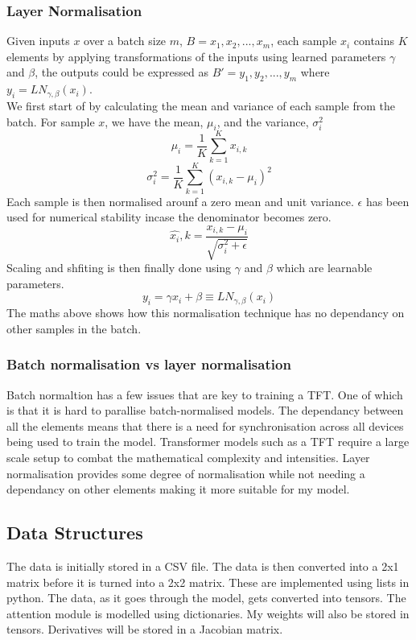 \documentclass{article}
\begin{document}
\subsubsection{Layer Normalisation}


Given inputs $x$ over a batch size $m$, $B = {x_1,x_2, ..., x_m}$, each sample $x_i$ contains $K$ elements by applying transformations of the inputs using learned parameters
$\gamma$ and $\beta$, the outputs could be expressed as $B' = {y_1,y_2,...,y_m}$ where
$y_i=LN_{\gamma,\beta}(x_i)$. \\
We first start of by calculating the mean and variance of each sample from the batch.
For sample $x$, we have the mean, $\mu_i$, and the variance, $\sigma_i^2$
$$\mu_i = \frac{1}{K}\sum^K_{k=1}x_{i,k}$$
$$\sigma_i^2 = \frac{1}{K}\sum^K_{k=1}(x_{i,k}-\mu_i)^2$$
Each sample is then normalised arounf a zero mean and unit variance. $\epsilon$ has been used for numerical stability incase the denominator becomes zero.
$$\hat{x_i},k= \frac{x_{i,k}-\mu_i}{\sqrt{\sigma_i^2+\epsilon}}$$
Scaling and shfiting is then finally done using $\gamma$ and $\beta$ which are learnable parameters.
$$y_i = \gamma \hat{x_i}+\beta \equiv LN_{\gamma,\beta}(x_i)$$
The maths above shows how this normalisation technique has no dependancy on other samples in the batch.
\subsubsection{Batch normalisation vs layer normalisation}
Batch normaltion has a few issues that are key to training a TFT. One of which is that
it is hard to parallise batch-normalised models. The dependancy between all the elements
 means that there is a need for synchronisation across all devices being used to train the model. Transformer models such as a TFT require a large scale setup to combat the
 mathematical complexity and intensities. Layer normalisation provides some degree of
 normalisation while not needing a dependancy on other elements making it more suitable
 for my model.
 \clearpage
\subsection{Data Structures}
The data is initially stored in a CSV file. The data is then converted into a 2x1 matrix before it is turned into a 2x2 matrix. These are implemented using lists in python. The data, as it goes through the model, gets converted into tensors.
The attention module is modelled using dictionaries.
My weights will also be stored in tensors.
Derivatives will be stored in a Jacobian matrix.
\clearpage
\end{document}
